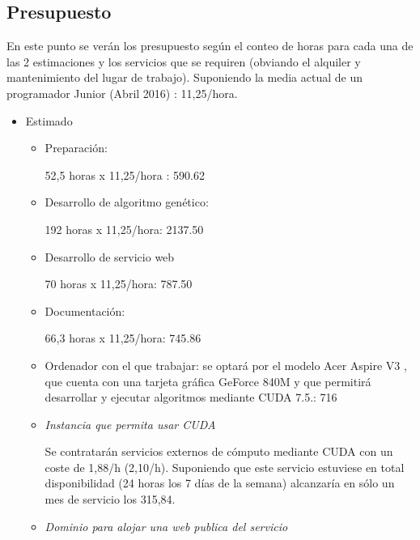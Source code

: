 \bigskip
\subsection{Presupuesto}
\bigskip


En este punto se verán los presupuesto según el conteo de horas para cada una de las 2 estimaciones y los servicios que se requiren (obviando el alquiler y mantenimiento del lugar de trabajo). Suponiendo la media actual de un programador Junior (Abril 2016) \cite{sueldos}: 11,25\officialeuro/hora.


\bigskip
\begin{itemize}
	
	\item Estimado
	\begin{itemize}
		\item Preparación: 
		
		52,5 horas x 11,25\officialeuro/hora : 590.62\officialeuro
		
		\item Desarrollo de algoritmo genético: 
		
		192 horas x 11,25\officialeuro/hora: 2137.50\officialeuro
		
		\item Desarrollo de servicio web
		
		70 horas x 11,25\officialeuro/hora: 787.50\officialeuro
		
		\item Documentación: 

		66,3 horas x 11,25\officialeuro/hora: 745.86\officialeuro
		
		\item Ordenador con el que trabajar: se optará por el modelo Acer Aspire V3 \cite{aceraspire}, que cuenta con una tarjeta gráfica GeForce 840M \cite{geforce840m} y que permitirá desarrollar y ejecutar algoritmos mediante CUDA 7.5.:  716\officialeuro
		
		\item \textit{Instancia que permita usar CUDA}
		
		Se contratarán servicios externos de cómputo mediante CUDA \cite{amazoncuda} con un coste de 1,88\officialeuro/h (2,10\textdollar/h). Suponiendo que este servicio estuviese en total disponibilidad (24 horas los 7 días de la semana) alcanzaría en sólo un mes de servicio los 315,84\officialeuro.
		
		\item \textit{Dominio para alojar una web publica del servicio}
		

\end{itemize}
\end{itemize}
